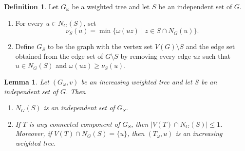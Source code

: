 \documentclass[12pt,amscd]{amsart}
\newtheorem{lem}[thm]{Lemma}
\theoremstyle{definition}
\newtheorem{defn}[thm]{Definition}
\begin{document}
\medskip

\begin{defn} Let $G_\omega$ be a weighted tree and let $S$ be an independent set of $G$.
\begin{enumerate}
    \item For every $u\in N_G(S)$, set
  $$\nu_S(u) = \min\{\omega(uz)\mid z\in S \cap N_G(u)\}.$$
    \item Define $G_S$ to be the graph with the vertex set $V(G)\setminus S$ and the edge set obtained from the edge set of $G\setminus S$ by removing every edge $uz$ such that  $u\in N_G(S)$ and $\omega(uz)\geqslant \nu_S(u)$.
\end{enumerate}
\end{defn}

\begin{lem}\label{components} Let $(G_\omega,v)$ be an  increasing weighted tree and let $S$ be an independent set of $G$. Then 
\begin{enumerate}
    \item $N_G(S)$ is an independent set of $G_S$.
    \item If $T$ is any connected component of $G_S$, then
    $|V(T)\cap N_G(S)| \leqslant 1$. Moreover, if $V(T)\cap N_G(S) = \{u\}$, then $(T_\omega,u)$ is  an increasing weighted tree.
\end{enumerate}
\end{lem}
\end{document}
